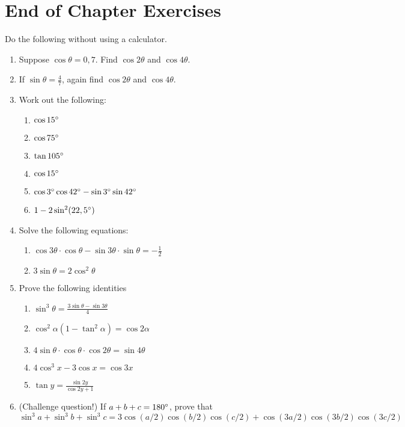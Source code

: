 \section{End of Chapter Exercises}
Do the following without using a calculator.
\begin{enumerate}
\item Suppose $\cos\theta=0,7$. Find $\cos 2\theta$ and $\cos 4\theta$.
\item If $\sin\theta=\frac{4}{7}$, again find $\cos 2\theta$ and $\cos 4\theta$.
\item Work out the following:
\begin{enumerate}
\item $\cos 15^{\circ}$
\item $\cos 75^{\circ}$
\item $\tan 105^{\circ}$
\item $\cos 15^{\circ}$
\item $\cos 3^{\circ} \cos 42^{\circ} -\sin 3^{\circ} \sin 42^{\circ}$
\item $1-2 \sin^2 (22,5^{\circ})$
\end{enumerate}
\item Solve the following equations:
\begin{enumerate}
\item $\cos 3\theta\cdot\cos\theta-\sin 3\theta\cdot\sin\theta=-\frac{1}{2}$
\item $3\sin \theta=2\cos^2\theta$

\end{enumerate}
\item Prove the following identities
\begin{enumerate}
\item $\sin^3\theta=\frac{3\sin\theta-\sin 3\theta}{4}$
\item $\cos^2\alpha (1-\tan^2\alpha)=\cos 2\alpha$
\item $4\sin\theta\cdot\cos\theta\cdot\cos 2\theta= \sin 4\theta$
\item $4\cos^3 x -3\cos x=\cos 3x$
\item $\tan y=\frac{\sin 2y}{\cos 2y+1}$
\end{enumerate}
\item (Challenge question!) If $a+b+c=180^{\circ}$, prove that 
$$\sin^3 a+\sin^3 b+ \sin^3 c = 3\cos(a/2)\cos(b/2)\cos(c/2)+ \cos(3a/2)\cos(3b/2)\cos(3c/2)$$

\end{enumerate}










